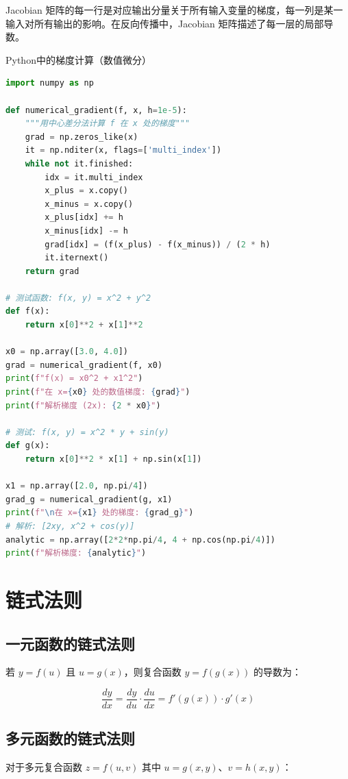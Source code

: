Jacobian 矩阵的每一行是对应输出分量关于所有输入变量的梯度，每一列是某一输入对所有输出的影响。在反向传播中，Jacobian 矩阵描述了每一层的局部导数。

\begin{mycode}{Python中的梯度计算（数值微分）}
\begin{lstlisting}[language=Python]
import numpy as np

def numerical_gradient(f, x, h=1e-5):
    """用中心差分法计算 f 在 x 处的梯度"""
    grad = np.zeros_like(x)
    it = np.nditer(x, flags=['multi_index'])
    while not it.finished:
        idx = it.multi_index
        x_plus = x.copy()
        x_minus = x.copy()
        x_plus[idx] += h
        x_minus[idx] -= h
        grad[idx] = (f(x_plus) - f(x_minus)) / (2 * h)
        it.iternext()
    return grad

# 测试函数: f(x, y) = x^2 + y^2
def f(x):
    return x[0]**2 + x[1]**2

x0 = np.array([3.0, 4.0])
grad = numerical_gradient(f, x0)
print(f"f(x) = x0^2 + x1^2")
print(f"在 x={x0} 处的数值梯度: {grad}")
print(f"解析梯度 (2x): {2 * x0}")

# 测试: f(x, y) = x^2 * y + sin(y)
def g(x):
    return x[0]**2 * x[1] + np.sin(x[1])

x1 = np.array([2.0, np.pi/4])
grad_g = numerical_gradient(g, x1)
print(f"\n在 x={x1} 处的梯度: {grad_g}")
# 解析: [2xy, x^2 + cos(y)]
analytic = np.array([2*2*np.pi/4, 4 + np.cos(np.pi/4)])
print(f"解析梯度: {analytic}")
\end{lstlisting}
\end{mycode}

\section{链式法则}

\subsection{一元函数的链式法则}

若 $y=f(u)$ 且 $u=g(x)$，则复合函数 $y=f(g(x))$ 的导数为：

\[
\frac{dy}{dx} = \frac{dy}{du} \cdot \frac{du}{dx} = f'(g(x)) \cdot g'(x)
\]

\subsection{多元函数的链式法则}

对于多元复合函数 $z=f(u,v)$ 其中 $u=g(x,y)$、$v=h(x,y)$：

